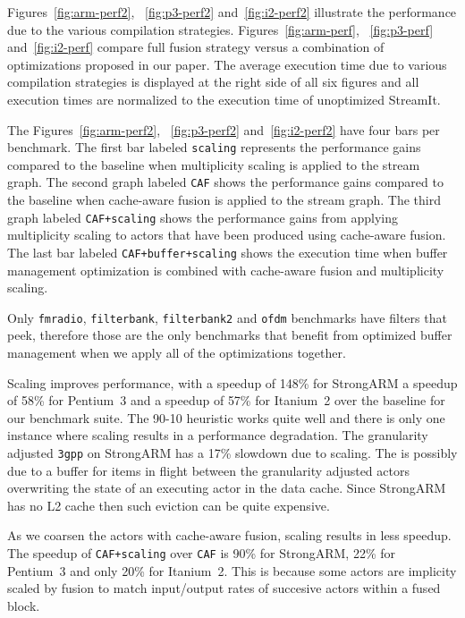 Figures~\ref{fig:arm-perf2}, ~\ref{fig:p3-perf2} and~\ref{fig:i2-perf2} 
illustrate the performance due to the various compilation strategies. 
Figures~\ref{fig:arm-perf}, ~\ref{fig:p3-perf} and~\ref{fig:i2-perf} 
compare full fusion strategy versus a combination of optimizations 
proposed in our paper. The average execution time due to various compilation 
strategies is displayed at the right side of all six figures and all 
execution times are normalized to the execution time of unoptimized 
StreamIt.


The Figures~\ref{fig:arm-perf2}, ~\ref{fig:p3-perf2} and~\ref{fig:i2-perf2} 
have four bars per benchmark. The first bar labeled {\tt scaling}
represents the performance gains compared to the baseline when multiplicity
scaling is applied to the stream graph. The second graph labeled 
{\tt CAF} shows the performance gains compared to the baseline when 
cache-aware fusion is applied to the stream graph. The third graph
labeled {\tt CAF+scaling} shows the performance gains from applying
multiplicity scaling to actors that have been produced using cache-aware
fusion. The last bar labeled \texttt{CAF+buffer+scaling} shows the
execution time when buffer management optimization is combined with
cache-aware fusion and multiplicity scaling.


Only \texttt{fmradio}, \texttt{filterbank}, \texttt{filterbank2}
and \texttt{ofdm} benchmarks have filters that peek, therefore those are the 
only benchmarks that benefit from optimized buffer management when we 
apply all of the optimizations together. 


Scaling improves performance, with a speedup of 148\% for
StrongARM a speedup of 58\% for Pentium~3 and a speedup of 57\% for Itanium~2 over the baseline for our benchmark suite. 
The 90-10 heuristic works quite well and there is only one instance
where scaling results in a performance degradation. The granularity adjusted
\texttt{3gpp} on StrongARM has a 17\% slowdown due to scaling. The is possibly 
due to a buffer for items in flight between the granularity adjusted
actors overwriting the state of an executing actor in the data cache.
Since StrongARM has no L2 cache then such eviction can be quite expensive.

As we coarsen the actors with cache-aware fusion, scaling results 
in less speedup. The speedup of \texttt{CAF+scaling} over \texttt{CAF} is
90\% for StrongARM, 22\% for Pentium~3 and only 20\% for Itanium~2. 
This is because some actors are implicity scaled by fusion to match 
input/output rates of succesive actors within a fused block. 


